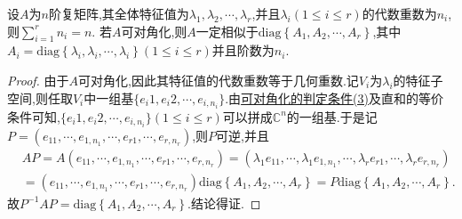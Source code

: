 \documentclass[../../main.tex]{subfiles}%
\begin{document}
\begin{theorem}\label{theorem:矩阵可对角化一定相似于由其全体特征值构成的对角阵}
设$A$为$n$阶复矩阵,其全体特征值为$\lambda_1,\lambda_2,\cdots,\lambda_r$,并且$\lambda_i\left( 1\leqslant i\leqslant r \right)$的代数重数为$n_i$,则$\sum_{i=1}^{r}n_i=n$. 若$A$可对角化,则$A$一定相似于$\mathrm{diag}\left\{ A_1,A_2,\cdots ,A_r \right\}$,其中$A_i=\mathrm{diag}\left\{ \lambda _i,\lambda _i,\cdots ,\lambda _i \right\} \left( 1\leqslant i\leqslant r \right)$并且阶数为$n_i$.
\end{theorem}
\begin{proof}
由于$A$可对角化,因此其特征值的代数重数等于几何重数.记$V_i$为$\lambda_i$的特征子空间,则任取$V_i$中一组基$\{e_i1,e_i2,\cdots,e_{i,n_i}\}$.由\hyperref[theorem:可对角化的判定条件]{可对角化的判定条件(3)}及直和的等价条件可知,$\{e_i1,e_i2,\cdots,e_{i,n_i}\}\left( 1\leqslant i\leqslant r \right)$可以拼成$\mathbb{C}^n$的一组基.于是记$P=(e_{11},\cdots,e_{1,n_1},\cdots,e_{r1},\cdots,e_{r,n_r})$,则$P$可逆,并且
\begin{align*}
&AP=A\left( e_{11},\cdots ,e_{1,n_1},\cdots ,e_{r1},\cdots ,e_{r,n_r} \right) =\left( \lambda _1e_{11},\cdots ,\lambda _1e_{1,n_1},\cdots ,\lambda _re_{r1},\cdots ,\lambda _re_{r,n_r} \right) 
\\
&=\left( e_{11},\cdots ,e_{1,n_1},\cdots ,e_{r1},\cdots ,e_{r,n_r} \right) \mathrm{diag}\left\{ A_1,A_2,\cdots ,A_r \right\} =P\mathrm{diag}\left\{ A_1,A_2,\cdots ,A_r \right\} .
\end{align*}
故$P^{-1}AP=\mathrm{diag}\left\{ A_1,A_2,\cdots ,A_r \right\} .$结论得证.
\end{proof}
\end{document}
